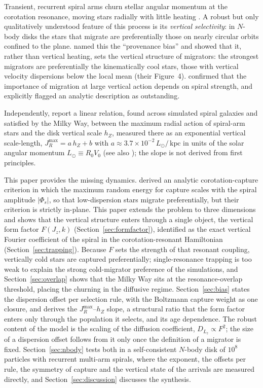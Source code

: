 \documentclass[twocolumn]{aastex701}
\newcommand{\Jz}{J_z}
\newcommand{\Lz}{L_z}
\newcommand{\JR}{J_R}
\newcommand{\hZ}{h_Z}
\newcommand{\Lsun}{L_\odot}
\newcommand{\kpc}{\,\mathrm{kpc}}
\begin{document}
Transient, recurrent spiral arms
\citep{SellwoodCarlberg1984,DOnghia2013,Baba2013,SellwoodCarlberg2014} churn stellar
angular momentum at the corotation resonance, moving stars radially with little
heating \citep{SellwoodBinney2002,Roskar2008}. A robust but only qualitatively
understood feature of this process is its \emph{vertical selectivity}: in $N$-body
disks the stars that migrate are preferentially those on nearly circular orbits
confined to the plane.
\citet{VeraCiro2016imprint} named this the ``provenance bias'' and showed that it,
rather than vertical heating, sets the vertical structure of migrators: the
strongest migrators are preferentially the kinematically cool stars, those with
vertical velocity dispersions below the local mean (their Figure~4).
\citet{Mikkola2020} confirmed that the importance of migration at large vertical
action depends on spiral strength, and explicitly flagged an analytic description
as outstanding.

Independently, \citet{Palicio2024} report a linear relation, found across simulated
spiral galaxies and satisfied by the Milky Way, between the maximum radial action
of spiral-arm stars and the disk vertical scale $\hZ$, measured there as an
exponential vertical scale-length, $\JR^{\max}=a\,\hZ+b$ with
$a\approx3.7\times10^{-2}\,\Lsun/\kpc$ in units of the solar angular momentum
$\Lsun\equiv R_0V_0$ (see also \citealt{Jia2024}); the slope is not derived from first
principles.

This paper provides the missing dynamics. \citet{DanielWyse2015,DanielWyse2018}
derived an analytic corotation-capture criterion in which the maximum random energy
for capture scales with the spiral amplitude $|\Phi_s|$, so that low-dispersion
stars migrate preferentially, but their criterion is strictly in-plane. This paper
extends the problem to three dimensions and shows that the vertical structure enters
through a single object, the vertical form factor $F(\Jz,k)$
(Section~\ref{sec:formfactor}), identified as the exact vertical
Fourier coefficient of the spiral in the corotation-resonant Hamiltonian
(Section~\ref{sec:trapping}). Because $F$ sets the strength of that resonant
coupling, vertically cold stars are captured preferentially; single-resonance
trapping is too weak to explain the strong
cold-migrator preference of the simulations, and Section~\ref{sec:overlap} shows
that the Milky Way sits at the
\citet{Chirikov1979} resonance-overlap threshold, placing the churning in the
diffusive regime. Section~\ref{sec:bias} states the dispersion offset per selection
rule, with the Boltzmann capture weight as one closure, and derives the
$\JR^{\max}$--$\hZ$ slope, a structural ratio that the form factor enters only through
the population it selects, and its age dependence. The robust content of the model is
the scaling of the diffusion coefficient, $D_{\Lz}\propto F^2$; the size of a
dispersion offset follows from it only once the definition of a migrator is fixed.
Section~\ref{sec:nbody} tests both in a self-consistent $N$-body disk of $10^8$
particles with recurrent multi-arm spirals, where the exponent, the offsets per rule,
the symmetry of capture and the vertical state of the arrivals are measured directly,
and Section~\ref{sec:discussion} discusses the synthesis.
\end{document}
